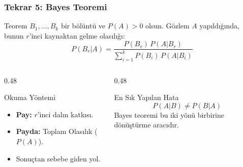 \documentclass[light]{lutbeamer}
\begin{document}
\begin{frame}[fragile]
    \frametitle{Tekrar 5: Bayes Teoremi}
    \begin{block}{Teorem}
        $B_1, \dots, B_k$ bir bölüntü ve $P(A) > 0$ olsun. Gözlem $A$ yapıldığında, bunun $r$'inci kaynaktan gelme olasılığı:
        \[
        P(B_r | A) = \frac{P(B_r)\, P(A|B_r)}{\displaystyle\sum_{i=1}^{k} P(B_i)\, P(A|B_i)}
        \]
    \end{block}

    \begin{columns}[T]
        \begin{column}{0.48\textwidth}
            \begin{exampleblock}{Okuma Yöntemi}
                \begin{itemize}
                    \item \textbf{Pay:} $r$'inci dalın katkısı.
                    \item \textbf{Payda:} Toplam Olasılık ($P(A)$).
                    \item Sonuçtan sebebe giden yol.
                \end{itemize}
            \end{exampleblock}
        \end{column}
        \begin{column}{0.48\textwidth}
            \begin{alertblock}{En Sık Yapılan Hata}
                \[
                P(A|B) \neq P(B|A)
                \]
                Bayes teoremi bu iki yönü birbirine dönüştürme aracıdır.
            \end{alertblock}
        \end{column}
    \end{columns}
\end{frame}
\end{document}
